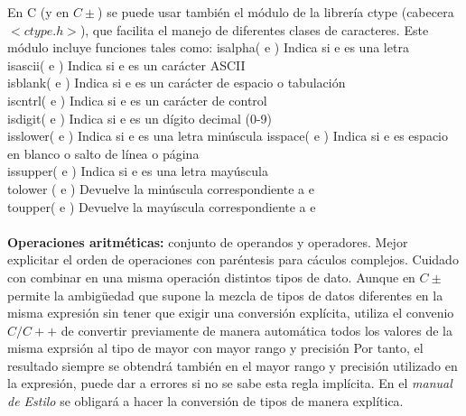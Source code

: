 \documentclass[11pt,a4paper]{article}
\begin{document}
	En C (y en $C\pm$) se puede usar también el módulo de la librería ctype (cabecera $<ctype.h>$), que facilita el manejo de diferentes clases de caracteres. Este módulo incluye funciones tales como:
	isalpha( e ) Indica si e es una letra \\
	isascii( e ) Indica si e es un carácter ASCII \\
	isblank( e ) Indica si e es un carácter de espacio o tabulación\\
	iscntrl( e ) Indica si e es un carácter de control\\  
	isdigit( e ) Indica si e es un dígito decimal (0-9) \\
	isslower( e ) Indica si e es una letra minúscula 
	isspace( e ) Indica si e es espacio en blanco o salto de línea o página \\
	issupper( e ) Indica si e es una letra mayúscula \\
	tolower ( e ) Devuelve la minúscula correspondiente a e \\
	toupper( e ) Devuelve la mayúscula correspondiente a e\\
	\\
	\textbf{Operaciones aritméticas:} conjunto de operandos y operadores.
	Mejor explicitar el orden de operaciones con paréntesis para cáculos complejos. Cuidado con combinar en una misma operación distintos tipos de dato. Aunque en $C\pm$ permite la ambigüedad que supone la mezcla de tipos de datos diferentes en la misma expresión sin tener que exigir una conversión explícita, utiliza el convenio $C/C++$ de convertir previamente de manera automática todos los valores de la misma exprsión al tipo de mayor con mayor rango y precisión Por tanto, el resultado siempre se obtendrá también en el mayor rango y precisión utilizado en la expresión, puede dar a errores si no se sabe esta regla implícita. En el \textit{manual de Estilo} se obligará a hacer la conversión de tipos de manera explítica.
\end{document}
